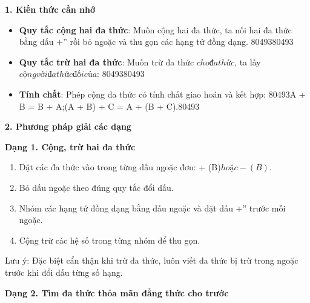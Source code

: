 \textbf{1. Kiến thức cần nhớ}
\begin{itemize}
\item \textbf{Quy tắc cộng hai đa thức}: Muốn cộng hai đa thức, ta nối hai đa thức bằng dấu $+$'' rồi bỏ ngoặc và thu gọn các hạng tử đồng dạng.
8049380493
\item \textbf{Quy tắc trừ hai đa thức}: Muốn trừ đa thức $ cho đa thức $, ta lấy $ cộng với đa thức đối của $:
8049380493
\item \textbf{Tính chất}: Phép cộng đa thức có tính chất giao hoán và kết hợp:
80493A + B = B + A;\quad (A + B) + C = A + (B + C).80493
\end{itemize}

\textbf{2. Phương pháp giải các dạng}

\textbf{Dạng 1. Cộng, trừ hai đa thức}
\begin{enumerate}
\item Đặt các đa thức vào trong từng dấu ngoặc đơn:  + (B)$ hoặc  - (B)$.
\item Bỏ dấu ngoặc theo đúng quy tắc đổi dấu.
\item Nhóm các hạng tử đồng dạng bằng dấu ngoặc và đặt dấu $+$'' trước mỗi ngoặc.
\item Cộng trừ các hệ số trong từng nhóm để thu gọn.
\end{enumerate}
Lưu ý: Đặc biệt cẩn thận khi trừ đa thức, luôn viết đa thức bị trừ trong ngoặc trước khi đổi dấu từng số hạng.

\textbf{Dạng 2. Tìm đa thức thỏa mãn đẳng thức cho trước}

